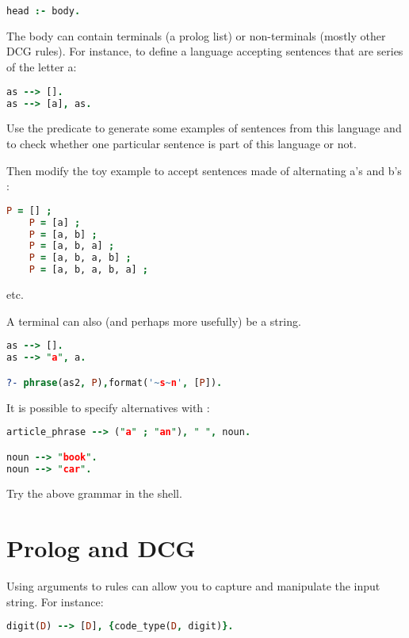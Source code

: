 \documentclass{../../../tp}
\begin{document}
\begin{lstlisting}[language=prolog]
head :- body.
\end{lstlisting}

The body can contain terminals (a prolog list) or non-terminals (mostly other DCG rules). For instance, to define a language accepting sentences that are series of the letter a:

\begin{lstlisting}[language=prolog]
as --> [].
as --> [a], as.
\end{lstlisting}

\begin{instruction}
	Use the  predicate to generate some examples of sentences from this language and to check whether one particular sentence is part of this language or not.
	
	Then modify the toy example to accept sentences made of alternating a's and b's :
	\begin{lstlisting}[language=prolog]
	P = [] ;
	P = [a] ;
	P = [a, b] ;
	P = [a, b, a] ;
	P = [a, b, a, b] ;
	P = [a, b, a, b, a] ;
	\end{lstlisting}
	etc.
\end{instruction}

A terminal can also (and perhaps more usefully) be a string. 
\begin{lstlisting}[language=prolog]
as --> [].
as --> "a", a.

?- phrase(as2, P),format('~s~n', [P]).
\end{lstlisting}

It is possible to specify alternatives with \prologcode{;}:
\begin{lstlisting}[language=prolog]
article_phrase --> ("a" ; "an"), " ", noun.

noun --> "book".                                         
noun --> "car".
\end{lstlisting}

Try the above grammar in the shell.

\section{Prolog and DCG}

Using arguments to rules can allow you to capture and manipulate the input string. For instance:
\begin{lstlisting}[language=prolog]
digit(D) --> [D], {code_type(D, digit)}.
\end{lstlisting}
\end{document}
